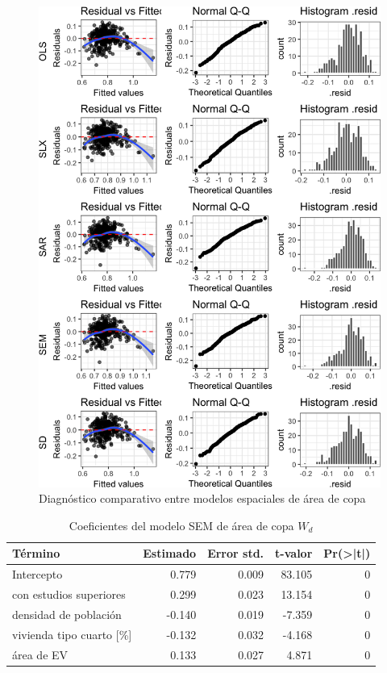 \documentclass[12pt,a4paper,openany]{book}
\theoremstyle{definition}
\theoremstyle{definition}
\theoremstyle{definition}
\theoremstyle{remark}
\begin{document}
\begin{figure}[H]

{\centering \includegraphics[width=1\linewidth]{tesis-unigis_files/figure-latex/diag-model-espaciales-1} 

}

\caption{Diagnóstico comparativo entre modelos espaciales de área de copa}\label{fig:diag-model-espaciales}
\end{figure}

\begin{table}[H]

\caption{\label{tab:coef-sem-copa-wd}Coeficientes del modelo SEM de área de copa $W_d$}
\centering
\begin{tabular}{lrrrr}
\toprule
Término & Estimado & Error std. & t-valor & Pr(>|t|)\\
\midrule
Intercepto & 0.779 & 0.009 & 83.105 & 0\\
con estudios superiores & 0.299 & 0.023 & 13.154 & 0\\
densidad de población & -0.140 & 0.019 & -7.359 & 0\\
vivienda tipo cuarto [\%] & -0.132 & 0.032 & -4.168 & 0\\
área de EV & 0.133 & 0.027 & 4.871 & 0\\
\bottomrule
\end{tabular}
\end{table}
\end{document}
